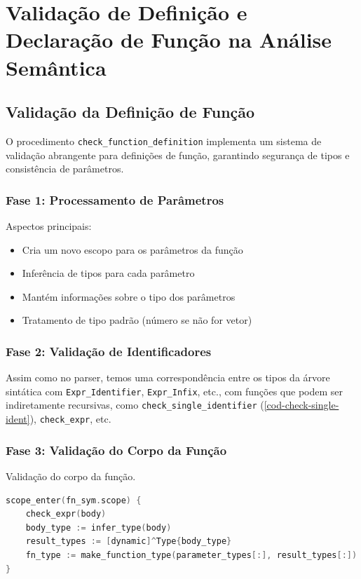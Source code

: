 \section{Validação de Definição e Declaração de Função na Análise Semântica}

\subsection{Validação da Definição de Função}
O procedimento \verb`check_function_definition` implementa um sistema de validação abrangente para definições de função, garantindo segurança de tipos e consistência de parâmetros.

\subsubsection{Fase 1: Processamento de Parâmetros}
Aspectos principais:
\begin{itemize}
    \item Cria um novo escopo para os parâmetros da função
    \item Inferência de tipos para cada parâmetro
    \item Mantém informações sobre o tipo dos parâmetros
    \item Tratamento de tipo padrão (número se não for vetor)
\end{itemize}

\subsubsection{Fase 2: Validação de Identificadores}
Assim como no parser, temos uma correspondência entre os tipos da árvore sintática com \verb|Expr_Identifier|, \verb|Expr_Infix|, etc., com funções que podem ser indiretamente recursivas, como \verb|check_single_identifier| (\autoref{cod-check-single-ident}), \verb|check_expr|, etc.

\subsubsection{Fase 3: Validação do Corpo da Função}
\begin{codigo}[htb]
    \caption{\small Validação do corpo da função.}
    \label{cod-function-body-validation}
\begin{lstlisting}[language=C, numbers=none, frame=none, inputencoding=latin1]
scope_enter(fn_sym.scope) {
    check_expr(body)
    body_type := infer_type(body)
    result_types := [dynamic]^Type{body_type}
    fn_type := make_function_type(parameter_types[:], result_types[:])
}
\end{lstlisting}
\end{codigo}

